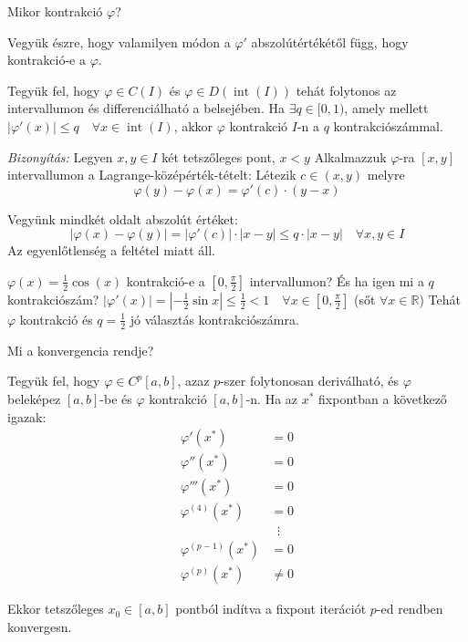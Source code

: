 \begin{kerdes}
    Mikor kontrakció $\varphi$?
\end{kerdes}

Vegyük észre, hogy valamilyen módon a $\varphi'$ abszolútértékétől függ, hogy kontrakció-e a $\varphi$.

\begin{allitas}
    Tegyük fel, hogy $\varphi \in C(I)$ és $\varphi\in D(\operatorname{int}(I))$ tehát folytonos az intervallumon és differenciálható a belsejében. Ha $\exists q \in [0, 1)$, amely mellett $\lvert \varphi'(x) \rvert \leq q \quad \forall x \in \operatorname{int}(I)$, akkor $\varphi$ kontrakció $I$-n a $q$ kontrakciószámmal.
\end{allitas}

\textit{Bizonyítás:} Legyen $x, y \in I$ két tetszőleges pont, $x < y$ 
Alkalmazzuk $\varphi$-ra $[x, y]$ intervallumon a Lagrange-középérték-tételt:
Létezik $c \in ( x, y)$ melyre
$$
\varphi (y) - \varphi(x) = \varphi'(c) \cdot (y - x)
$$

Vegyünk mindkét oldalt abszolút értéket:
$$
\lvert \varphi(x) - \varphi(y) \rvert  = \lvert \varphi'(c) \rvert \cdot \lvert x - y \rvert \leq q \cdot \lvert  x- y \rvert \quad \forall x, y \in I
$$
Az egyenlőtlenség a feltétel miatt áll.


\begin{pelda}
    $\varphi(x) = \frac{1}{2}\cos(x)$ kontrakció-e a $\left[ 0, \frac{\pi}{2} \right]$ intervallumon? És ha igen mi a $q$ kontrakciószám?
    $\lvert \varphi'(x) \rvert = \left\lvert  -\frac{1}{2}\sin x  \right\rvert \leq \frac{1}{2} < 1 \quad \forall x \in [0, \frac{\pi}{2}]$ (sőt $\forall x \in \mathbb{R}$)
    Tehát $\varphi$ kontrakció és $q = \frac{1}{2}$ jó választás kontrakciószámra.
\end{pelda}

\begin{kerdes}
    Mi a konvergencia rendje?
\end{kerdes}

\begin{allitas}
    Tegyük fel, hogy $\varphi \in C^{p}[a, b]$, azaz $p$-szer folytonosan deriválható, és $\varphi$ beleképez $[a, b]$-be és $\varphi$ kontrakció $[a, b]$-n. Ha az $x^{*}$ fixpontban a következő igazak:
    \begin{align*}
        \varphi'(x^{*}) & = 0 \\
        \varphi''(x^{*}) & = 0 \\
        \varphi'''(x^{*}) & = 0 \\
        \varphi ^{(4)}(x^{*}) & = 0 \\
        & \; \; \vdots \\
        \varphi ^{(p-1)}(x^{*}) & = 0 \\
        \varphi ^{(p)}(x^{*}) & \neq 0 
    \end{align*}
    
    Ekkor tetszőleges $x_{0} \in [a ,b]$ pontból indítva a fixpont iterációt $p$-ed rendben konvergesn.
\end{allitas}

